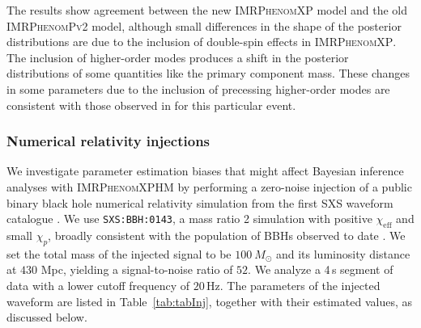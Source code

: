 \documentclass[%
aps,
prd,
amssymb,
amsmath,
amsfonts,
eqsecnum,
showpacs,
nofootinbib,
floatfix,
twocolumn,
twoside,
a4paper,
superscriptaddress
]{revtex4-1}
\newcommand{\phPvtwo}{\textsc{IMRPhenomPv2}\xspace}
\newcommand{\phXP}{\textsc{IMRPhenomXP}\xspace}
\newcommand{\phXPHM}{\textsc{IMRPhenomXPHM}\xspace}
\begin{document}
The results show agreement between the new \phXP model and the old \phPvtwo model, although small differences in the shape of the posterior distributions are due to the inclusion of double-spin effects in \phXP. The inclusion of higher-order modes produces a shift in the posterior distributions of some quantities like the primary component mass. These changes in some parameters due to the inclusion of precessing higher-order modes are consistent with those observed in \cite{Khan:2019kot} for this particular event.


\subsubsection{Numerical relativity injections}
\label{sec:pe_nr_injections}

We investigate parameter estimation biases that might affect Bayesian inference analyses with \phXPHM by performing a zero-noise injection of a public binary black hole numerical relativity simulation from the first SXS waveform catalogue \cite{SXS:catalog}. We use \texttt{SXS:BBH:0143}, a mass ratio 
2 simulation with positive $\chi_\mathrm{eff}$ and small $\chi_p$, broadly consistent with the population of BBHs observed to date \cite{Abbott:2020niy,Abbott:2020gyp}.
We set the total mass of the injected signal to be $100~M_{\odot}$ and its luminosity distance at $430$ Mpc, yielding a signal-to-noise ratio of $52$. We analyze a 4\,s segment of data with a lower cutoff frequency of $20$\,Hz.
The parameters of the injected waveform are listed in Table~\ref{tab:tabInj}, together with their estimated values, as discussed below.
\end{document}
